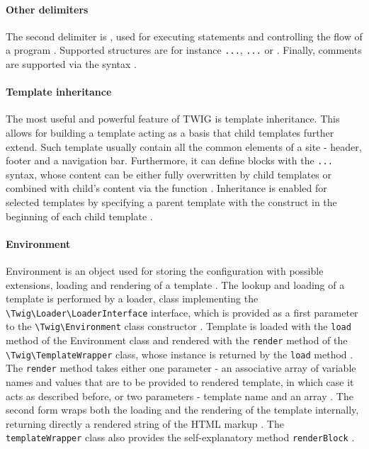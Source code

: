 \paragraph{Other delimiters}
The second delimiter is \texttt{}, used for executing statements and controlling the flow of a program \citep{twig.docs}. Supported structures are for instance \texttt{...}, \texttt{...} or \texttt{} \citep{twig.docs}. Finally, comments are supported via the \texttt{} syntax \citep{twig.docs}.


\paragraph{Template inheritance}
The most useful and powerful feature of TWIG is template inheritance. This allows for building a template acting as a basis that child templates further extend. Such template usually contain all the common elements of a site - header, footer and a navigation bar. Furthermore, it can define blocks with the \texttt{...} syntax, whose content can be either fully overwritten by child templates or combined with child's content via the \texttt{} function \citep{twig.docs}. Inheritance is enabled for selected templates by specifying a parent template with the \texttt{} construct in the beginning of each child template \citep{twig.docs}.

\paragraph{Environment}
Environment is an object used for storing the configuration with possible extensions, loading and rendering of a template \citep{twig.docs}. The lookup and loading of a template is performed by a loader, class implementing the \texttt{\textbackslash{}Twig\textbackslash{}Loader\textbackslash{}LoaderInterface} interface, which is provided as a first parameter to the \texttt{\textbackslash{}Twig\textbackslash{}Environment} class constructor \citep{twig.docs}. Template is loaded with the \texttt{load} method of the Environment class and rendered with the \texttt{render} method of the \texttt{\textbackslash{}Twig\textbackslash{}TemplateWrapper} class, whose instance is returned by the \texttt{load} method \citep{twig.docs}. The \texttt{render} method takes either one parameter - an associative array of variable names and values that are to be provided to rendered template, in which case it acts as described before, or two parameters - template name and an array \citep{twig.docs}. The second form wraps both the loading and the rendering of the template internally, returning directly a rendered string of the HTML markup \citep{twig.docs}. The \texttt{templateWrapper} class also provides the self-explanatory method \texttt{renderBlock} \citep{twig.docs}.

